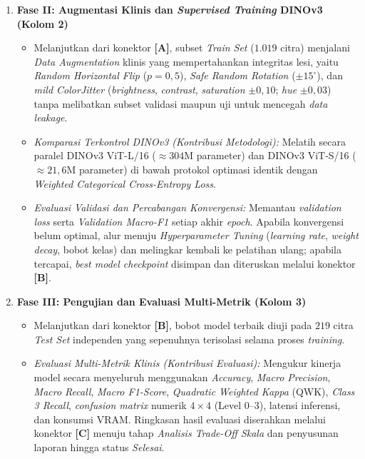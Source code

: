 \begin{enumerate}
    \item \textbf{Fase II: Augmentasi Klinis dan \textit{Supervised Training} DINOv3 (Kolom 2)}
          \begin{itemize}
              \item Melanjutkan dari konektor \textbf{[A]}, subset \textit{Train Set} ($1.019$ citra) menjalani \textit{Data Augmentation} klinis yang mempertahankan integritas lesi, yaitu \textit{Random Horizontal Flip} ($p=0,5$), \textit{Safe Random Rotation} ($\pm 15^\circ$), dan \textit{mild ColorJitter} (\textit{brightness}, \textit{contrast}, \textit{saturation} $\pm 0,10$; \textit{hue} $\pm 0,03$) tanpa melibatkan subset validasi maupun uji untuk mencegah \textit{data leakage}.
              \item \textit{Komparasi Terkontrol DINOv3 (Kontribusi Metodologi):} Melatih secara paralel DINOv3 ViT-L/16 ($\approx 304\text{M}$ parameter) dan DINOv3 ViT-S/16 ($\approx 21,6\text{M}$ parameter) di bawah protokol optimasi identik dengan \textit{Weighted Categorical Cross-Entropy Loss}.
              \item \textit{Evaluasi Validasi dan Percabangan Konvergensi:} Memantau \textit{validation loss} serta \textit{Validation Macro-F1} setiap akhir \textit{epoch}. Apabila konvergensi belum optimal, alur menuju \textit{Hyperparameter Tuning} (\textit{learning rate}, \textit{weight decay}, bobot kelas) dan melingkar kembali ke pelatihan ulang; apabila tercapai, \textit{best model checkpoint} disimpan dan diteruskan melalui konektor \textbf{[B]}.
          \end{itemize}

    \item \textbf{Fase III: Pengujian dan Evaluasi Multi-Metrik (Kolom 3)}
          \begin{itemize}
              \item Melanjutkan dari konektor \textbf{[B]}, bobot model terbaik diuji pada $219$ citra \textit{Test Set} independen yang sepenuhnya terisolasi selama proses \textit{training}.
              \item \textit{Evaluasi Multi-Metrik Klinis (Kontribusi Evaluasi):} Mengukur kinerja model secara menyeluruh menggunakan \textit{Accuracy}, \textit{Macro Precision}, \textit{Macro Recall}, \textit{Macro F1-Score}, \textit{Quadratic Weighted Kappa} (QWK), \textit{Class 3 Recall}, \textit{confusion matrix} numerik $4\times 4$ (Level $0$--$3$), latensi inferensi, dan konsumsi VRAM. Ringkasan hasil evaluasi diserahkan melalui konektor \textbf{[C]} menuju tahap \textit{Analisis Trade-Off Skala} dan penyusunan laporan hingga status \textit{Selesai}.
          \end{itemize}
\end{enumerate}


